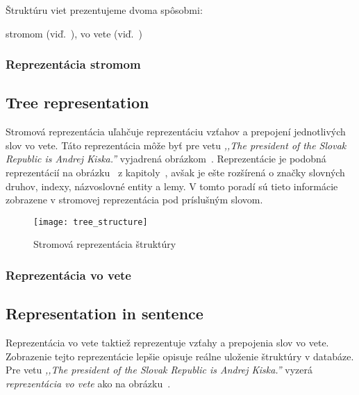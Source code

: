 Štruktúru viet prezentujeme dvoma spôsobmi:
\begin{my_itemize}
	\myitem stromom (viď.~),
	\myitem vo vete (viď.~)
\end{my_itemize}

%
%
{
	\subsubsection{Reprezentácia stromom}
}
{
	\subsection{Tree representation}
}
\label{subsubsection:structure_tree_representation}
Stromová reprezentácia uľahčuje reprezentáciu vzťahov a prepojení jednotlivých slov vo vete. Táto reprezentácia môže byť pre vetu \textit{,,The president of the Slovak Republic is Andrej Kiska.''} vyjadrená obrázkom~. Reprezentácie je podobná reprezentácií na obrázku~ z kapitoly~, avšak je ešte rozšírená o značky slovných druhov, indexy, názvoslovné entity a lemy. V tomto poradí sú tieto informácie zobrazene v stromovej reprezentácia pod príslušným slovom.

\begin{figure}[H]
	\begin{center}\texttt{[image: tree\_structure]}\end{center}
	\caption[Stromová reprezentácia štruktúry]{Stromová reprezentácia štruktúry}\label{fig:tree_structure}
\end{figure}

%
%
{
	\subsubsection{Reprezentácia vo vete}
}
{
	\subsection{Representation in sentence}
}
\label{subsubsection:structure_representation_in_sentence}
Reprezentácia vo vete taktiež reprezentuje vzťahy a prepojenia slov vo vete. Zobrazenie tejto reprezentácie lepšie opisuje reálne uloženie štruktúry v databáze. Pre vetu \textit{,,The president of the Slovak Republic is Andrej Kiska.''} vyzerá \textit{reprezentácia vo vete} ako na obrázku~.

